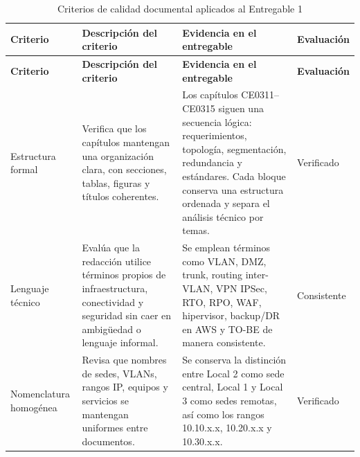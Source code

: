 \documentclass[11pt, a4paper, oneside]{report}
\begin{document}
\renewcommand{\arraystretch}{1.3}
\footnotesize
{}

\begin{xltabular}{\textwidth}{@{}|L{3.2cm}|X|X|L{2.2cm}|@{}}
\caption{Criterios de calidad documental aplicados al Entregable 1}
\label{tab:criterios_calidad_documental} \\

\parbox[c][1.1cm][c]{\linewidth}{\centering\color{white}\bfseries\small Criterio} &
\parbox[c][1.1cm][c]{\linewidth}{\centering\color{white}\bfseries\small Descripción del criterio} &
\parbox[c][1.1cm][c]{\linewidth}{\centering\color{white}\bfseries\small Evidencia en el entregable} &
\parbox[c][1.1cm][c]{\linewidth}{\centering\color{white}\bfseries\small Evaluación} \\ \hline
\endfirsthead

\parbox[c][1.1cm][c]{\linewidth}{\centering\color{white}\bfseries\small Criterio} &
\parbox[c][1.1cm][c]{\linewidth}{\centering\color{white}\bfseries\small Descripción del criterio} &
\parbox[c][1.1cm][c]{\linewidth}{\centering\color{white}\bfseries\small Evidencia en el entregable} &
\parbox[c][1.1cm][c]{\linewidth}{\centering\color{white}\bfseries\small Evaluación} \\ \hline
\endhead

\hline
\endfoot

{\small Estructura formal} &
{\small Verifica que los capítulos mantengan una organización clara, con secciones, tablas, figuras y títulos coherentes.} &
{\small Los capítulos CE0311--CE0315 siguen una secuencia lógica: requerimientos, topología, segmentación, redundancia y estándares. Cada bloque conserva una estructura ordenada y separa el análisis técnico por temas.} &
{\small Verificado} \\ \hline

{\small Lenguaje técnico} &
{\small Evalúa que la redacción utilice términos propios de infraestructura, conectividad y seguridad sin caer en ambigüedad o lenguaje informal.} &
{\small Se emplean términos como VLAN, DMZ, trunk, routing inter-VLAN, VPN IPSec, RTO, RPO, WAF, hipervisor, backup/DR en AWS y TO-BE de manera consistente.} &
{\small Consistente} \\ \hline

{\small Nomenclatura homogénea} &
{\small Revisa que nombres de sedes, VLANs, rangos IP, equipos y servicios se mantengan uniformes entre documentos.} &
{\small Se conserva la distinción entre Local 2 como sede central, Local 1 y Local 3 como sedes remotas, así como los rangos 10.10.x.x, 10.20.x.x y 10.30.x.x.} &
{\small Verificado} \\ \hline


\end{xltabular}
\end{document}
